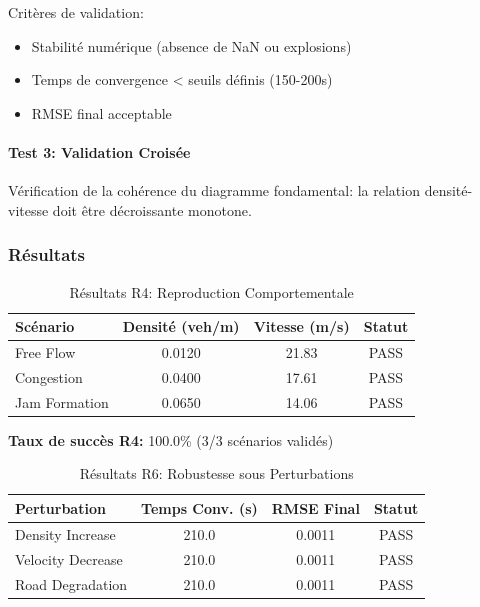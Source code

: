 Critères de validation:
\begin{itemize}
    \item Stabilité numérique (absence de NaN ou explosions)
    \item Temps de convergence < seuils définis (150-200s)
    \item RMSE final acceptable
\end{itemize}

\paragraph{Test 3: Validation Croisée}
Vérification de la cohérence du diagramme fondamental: la relation densité-vitesse doit être décroissante monotone.

\subsubsection{Résultats}


\begin{table}[htbp]
\centering
\caption{Résultats R4: Reproduction Comportementale}
\begin{tabular}{lccc}
\toprule
\textbf{Scénario} & \textbf{Densité (veh/m)} & \textbf{Vitesse (m/s)} & \textbf{Statut} \\
\midrule
Free Flow & 0.0120 & 21.83 & PASS \\
Congestion & 0.0400 & 17.61 & PASS \\
Jam Formation & 0.0650 & 14.06 & PASS \\
\bottomrule
\end{tabular}
\end{table}


\textbf{Taux de succès R4:} 100.0\% (3/3 scénarios validés)


\begin{table}[htbp]
\centering
\caption{Résultats R6: Robustesse sous Perturbations}
\begin{tabular}{lccc}
\toprule
\textbf{Perturbation} & \textbf{Temps Conv. (s)} & \textbf{RMSE Final} & \textbf{Statut} \\
\midrule
Density Increase & 210.0 & 0.0011 & PASS \\
Velocity Decrease & 210.0 & 0.0011 & PASS \\
Road Degradation & 210.0 & 0.0011 & PASS \\
\bottomrule
\end{tabular}
\end{table}


